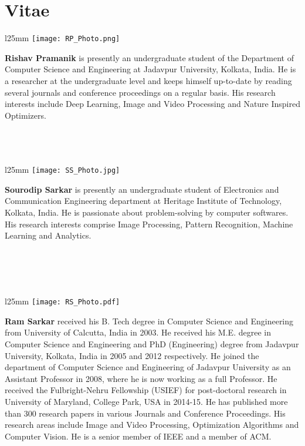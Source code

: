 \documentclass[final,3p,times]{elsarticle}
\begin{document}
\section*{Vitae}
\begin{wrapfigure}{l}{25mm} 
    \texttt{[image: RP\_Photo.png]}
  \end{wrapfigure}\par
  \textbf{Rishav Pramanik} is presently an undergraduate student of the Department of Computer Science and Engineering at Jadavpur University, Kolkata, India. He is a researcher at the undergraduate level and keeps himself up-to-date by reading several journals and conference proceedings on a regular basis. His research interests include Deep Learning, Image and Video Processing and Nature Inspired Optimizers.\\~\\~\\~\\\par
\begin{wrapfigure}{l}{25mm} 
    \texttt{[image: SS\_Photo.jpg]}
\end{wrapfigure}\par
\textbf{Sourodip Sarkar} is presently an undergraduate student of Electronics and Communication Engineering department at Heritage Institute of Technology, Kolkata, India. He is passionate about problem-solving by computer softwares. His research interests comprise Image Processing, Pattern Recognition, Machine Learning and Analytics.\\~\\~\\~\\~\\\par

\begin{wrapfigure}{l}{25mm} 
    \texttt{[image: RS\_Photo.pdf]}
  \end{wrapfigure}\par
  \textbf{Ram Sarkar} received his B. Tech degree in Computer Science and Engineering from University of Calcutta, India in 2003. He received his M.E. degree in Computer Science and Engineering and PhD (Engineering) degree from Jadavpur University, Kolkata, India in 2005 and 2012 respectively. He joined the department of Computer Science and Engineering of Jadavpur University as an Assistant Professor in 2008, where he is now working as a full Professor. He received the Fulbright-Nehru Fellowship (USIEF) for post-doctoral research in University of Maryland, College Park, USA in 2014-15. He has published more than 300 research papers in various Journals and Conference Proceedings. His research areas include Image and Video Processing, Optimization Algorithms and Computer Vision. He is a senior member of IEEE and a member of ACM.\par
\end{document}
